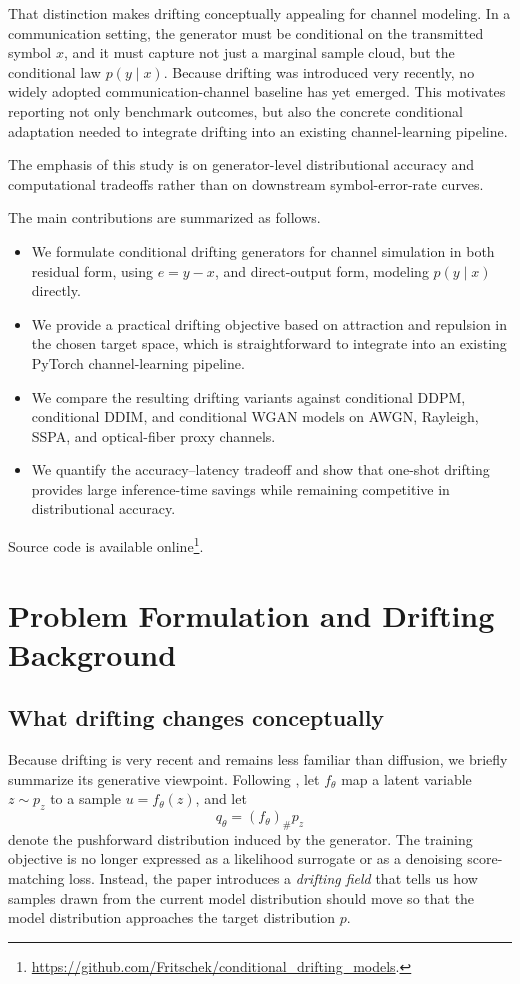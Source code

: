 \documentclass[conference]{IEEEtran}
\begin{document}
That distinction makes drifting conceptually appealing for channel modeling.
In a communication setting, the generator must be conditional on the transmitted symbol \(x\), and it must capture not just a marginal sample cloud, but the conditional law \(p(y \mid x)\).
Because drifting was introduced very recently, no widely adopted communication-channel baseline has yet emerged.
This motivates reporting not only benchmark outcomes, but also the concrete conditional adaptation needed to integrate drifting into an existing channel-learning pipeline.

The emphasis of this study is on generator-level distributional accuracy and computational tradeoffs rather than on downstream symbol-error-rate curves.

The main contributions are summarized as follows.
\begin{itemize}
\item We formulate conditional drifting generators for channel simulation in both residual form,
  using \(e = y - x\), and direct-output form, modeling \(p(y \mid x)\) directly.
\item We provide a practical drifting objective based on attraction and repulsion in the chosen
  target space, which is straightforward to integrate into an existing PyTorch channel-learning
  pipeline.
\item We compare the resulting drifting variants against conditional DDPM, conditional DDIM, and
  conditional WGAN models on AWGN, Rayleigh, SSPA, and optical-fiber proxy channels.
\item We quantify the accuracy--latency tradeoff and show that one-shot drifting provides large inference-time savings while remaining competitive in distributional accuracy.
\end{itemize}
Source code is available online\footnote{\url{https://github.com/Fritschek/conditional_drifting_models}.}.

\section{Problem Formulation and Drifting Background}
\subsection{What drifting changes conceptually}
Because drifting is very recent and remains less familiar than diffusion, we briefly summarize its generative viewpoint.
Following \cite{drifting}, let \(f_\theta\) map a latent variable \(z \sim p_z\) to a sample \(u = f_\theta(z)\), and let
\begin{equation}
q_\theta = (f_\theta)_\# p_z
\end{equation}
denote the pushforward distribution induced by the generator.
The training objective is no longer expressed as a likelihood surrogate or as a denoising score-matching loss.
Instead, the paper introduces a \emph{drifting field} that tells us how samples drawn from the current model distribution should move so that the model distribution approaches the target distribution \(p\).
\end{document}
